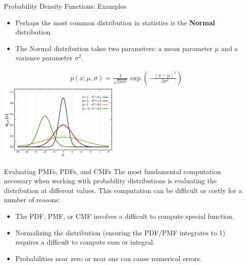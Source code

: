 \documentclass[serif,xcolor=pdftex,dvipsnames,table,hyperref={bookmarks=false,breaklinks}]{beamer}
\begin{document}
\begin{frame}[t]{Probability Density Functions: Examples}
	\begin{itemize}[<+->]
		\item Perhaps the most common distribution in statistics is the \textbf{Normal} distribution.
		\item The Normal distribution takes two parameters: a mean parameter $\mu$ and a variance parameter $\sigma^2$.
	\end{itemize}
	\pause
	\begin{align*}
		p(x;\mu,\sigma) = \frac{1}{\sqrt{2\pi\sigma^2}}\exp\left(-\frac{(x-\mu)^2}{2\sigma^2}\right)
	\end{align*}
	\centering
	\includegraphics[height=1.5in]{../Figures/Normal_Distribution_PDF.png}
\end{frame}


\begin{frame}[t]{Evaluating PMFs, PDFs, and CMFs}
	The most fundamental computation necessary when working with probability distributions is evaluating the distribution at different values. This computation can be difficult or costly for a number of reasons:
	\pause
	\begin{itemize}[<+->]
		\item The PDF, PMF, or CMF involves a difficult to compute special function.
		\item Normalizing the distribution (ensuring the PDF/PMF integrates to 1) requires a difficult to compute sum or integral.
		\item Probabilities near zero or near one can cause numerical errors.
	\end{itemize}
\end{frame}
\end{document}
